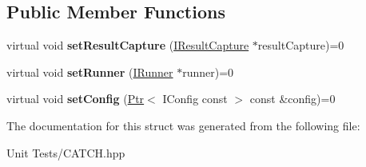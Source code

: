 \subsection*{Public Member Functions}
\begin{DoxyCompactItemize}
\item 
virtual void {\bfseries set\+Result\+Capture} (\hyperlink{structCatch_1_1IResultCapture}{I\+Result\+Capture} $\ast$result\+Capture)=0\hypertarget{structCatch_1_1IMutableContext_a4a80afd0525b7def21bee8d9b48f2d39}{}\label{structCatch_1_1IMutableContext_a4a80afd0525b7def21bee8d9b48f2d39}

\item 
virtual void {\bfseries set\+Runner} (\hyperlink{structCatch_1_1IRunner}{I\+Runner} $\ast$runner)=0\hypertarget{structCatch_1_1IMutableContext_af2e53b1dea4527a2587cff266a730f6e}{}\label{structCatch_1_1IMutableContext_af2e53b1dea4527a2587cff266a730f6e}

\item 
virtual void {\bfseries set\+Config} (\hyperlink{classCatch_1_1Ptr}{Ptr}$<$ I\+Config const  $>$ const \&config)=0\hypertarget{structCatch_1_1IMutableContext_a04ae4f4219a481a7bf658d9fd445bc1d}{}\label{structCatch_1_1IMutableContext_a04ae4f4219a481a7bf658d9fd445bc1d}

\end{DoxyCompactItemize}


The documentation for this struct was generated from the following file\+:\begin{DoxyCompactItemize}
\item 
Unit Tests/C\+A\+T\+C\+H.\+hpp\end{DoxyCompactItemize}

